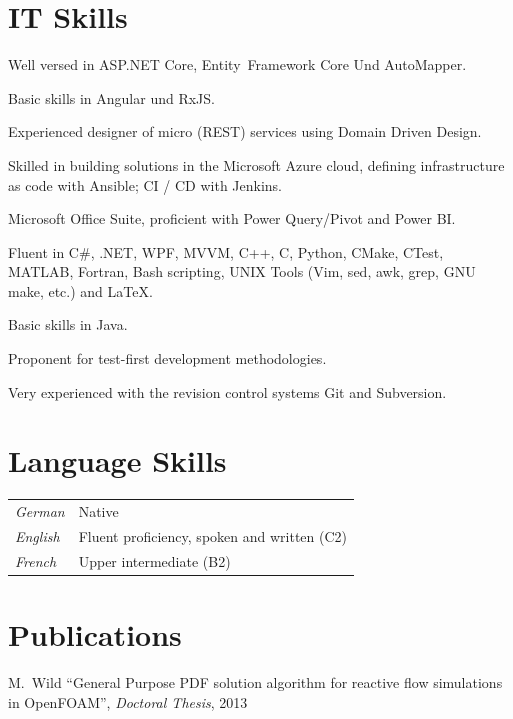 \documentclass[line,11pt,a4paper]{resume}
\begin{document}
\begin{resume}
\section{\mysidestyle IT Skills}\vspace{6mm}
\begin{list2}
  \item Well versed in ASP.NET Core, Entity~Framework Core Und AutoMapper.
  \item Basic skills in Angular und RxJS.
  \item Experienced designer of micro (REST) services using Domain Driven
    Design.
  \item Skilled in building solutions in the Microsoft Azure cloud, defining
    infrastructure as code with Ansible; CI / CD with Jenkins.
  \item Microsoft Office Suite, proficient with Power Query/Pivot and Power BI.
  \item Fluent in C\#, .NET, WPF, MVVM, C++, C, Python, CMake, CTest, MATLAB,
    Fortran, Bash scripting, UNIX Tools (Vim, sed, awk, grep, GNU make, etc.)
    and {\selectfont\LaTeX}.
  \item Basic skills in Java.
  \item Proponent for test-first development methodologies.
  \item Very experienced with the revision control systems Git and Subversion.
\end{list2}

\section{\mysidestyle Language Skills}\vspace{2mm}
\begin{tabular}{@{}ll}
  \textsl{German}  & Native \\
  \textsl{English} & Fluent proficiency, spoken and written (C2) \\
  \textsl{French}  & Upper intermediate (B2) \\
\end{tabular}

\section{\mysidestyle Publications}\vspace{2mm}
M.~Wild
``General Purpose PDF solution algorithm for reactive flow simulations in
OpenFOAM'', \textsl{Doctoral Thesis}, 2013


\end{resume}
\end{document}
